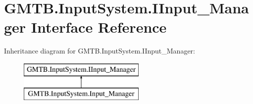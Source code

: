 \hypertarget{interface_g_m_t_b_1_1_input_system_1_1_i_input___manager}{}\section{G\+M\+T\+B.\+Input\+System.\+I\+Input\+\_\+\+Manager Interface Reference}
\label{interface_g_m_t_b_1_1_input_system_1_1_i_input___manager}
Inheritance diagram for G\+M\+T\+B.\+Input\+System.\+I\+Input\+\_\+\+Manager\+:\begin{figure}[H]
\begin{center}
\leavevmode
\includegraphics[height=2.000000cm]{interface_g_m_t_b_1_1_input_system_1_1_i_input___manager}
\end{center}
\end{figure}
